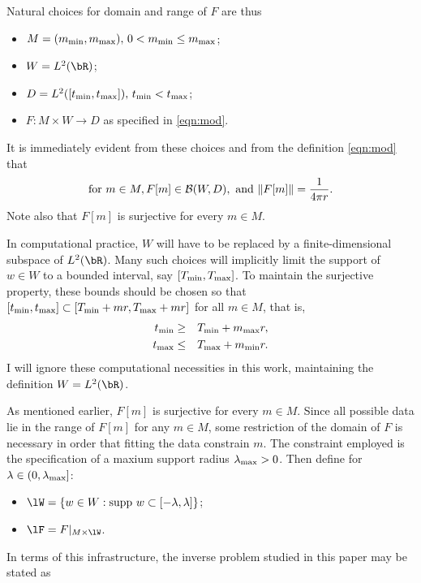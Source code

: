 Natural choices for domain and
range of $F$ are thus
\begin{itemize}
\item $M=(m_{\rm min}, m_{\rm max}),\,0 < m_{\rm min} \le m_{\rm
    max}$;
\item $W = L^2(\bR)$;
\item $D=L^2([t_{\rm min},t_{\rm max}]),\, t_{\rm min}<t_{\rm max}$;
\item $F: M \times W \rightarrow D$ as specified in \ref{eqn:mod}.
\end{itemize}
It is immediately evident from these choices and from the definition
\ref{eqn:mod} that
\begin{equation}
  \label{eqn:mapprop}
  \mbox{for }m \in M, F[m] \in {\cal B}(W,D),\mbox{ and }\|F[m]\| =
  \frac{1}{4\pi r}.
\end{equation}
Note also that $F[m]$ is surjective for every $m \in M$.

 In computational practice, $W$ will have to be replaced by a
finite-dimensional subspace of $L^2(\bR)$. Many such choices will
implicitly limit the support of $w \in W$ to a bounded interval, say
$[T_{\rm min},T_{\rm max}]$. To maintain the surjective property,
these bounds should be chosen so that $[t_{\rm min}, t_{\rm max}]
\subset [T_{\rm min}+mr,T_{\rm max}+mr]$ for all $m \in M$, that is,
\begin{eqnarray}
  \label{eqn:dombounds}
  t_{\rm min} &\ge & T_{\rm min}+m_{\rm max}r,\nonumber\\
  t_{\rm max} &\le & T_{\rm max}+m_{\rm min}r.
\end{eqnarray}
I will ignore these computational necessities in this work,
maintaining the definition $W=L^2(\bR)$.

As mentioned earlier, $F[m]$ is surjective for every $m \in M$. Since
all possible data lie in the range of $F[m]$ for any $m \in M$, some
restriction of the domain of $F$ is necessary in order that fitting
the data constrain $m$. The constraint employed is the specification
of a maxium support radius $\lambda_{\rm max} >0$. Then define for
$\lambda \in (0,\lambda_{\rm max}]$:
\begin{itemize}
\item $\lW = \{w \in W:
  \mbox{supp }w \subset [-\lambda,\lambda]\}$;
\item $\lF = F|_{M \times \lW}$.
\end{itemize}

In terms of this infrastructure, the inverse problem studied in 
this paper may be stated as

